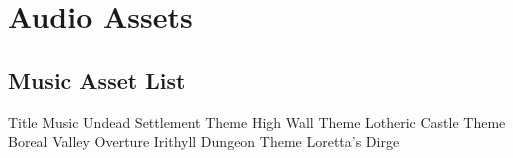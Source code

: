 \documentclass[11pt,fleqn]{book} %
\begin{document}



\chapter{Audio Assets}

\section{Music Asset List}
\begin{outline}
	\1 Title Music
	\1 Undead Settlement Theme
	\1 High Wall Theme
	\1 Lotheric Castle Theme
	\1 Boreal Valley Overture
	\1 Irithyll Dungeon Theme
	\1 Loretta's Dirge
\end{outline}

\end{document}
